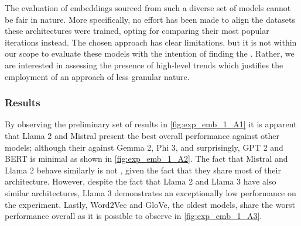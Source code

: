 
The evaluation of embeddings sourced from such a diverse set of models cannot be fair in nature.
More specifically, no effort has been made to align the datasets  these architectures were trained, opting for comparing their most popular iterations instead.
The chosen approach has clear limitations, but it is not within our scope to evaluate these models with the intention of finding the .
Rather, we are interested in assessing the presence of high-level trends which justifies the employment of an approach of less granular nature.

\subsubsection{Results}\label{sssec:exp_emb_exp1_results}

By observing the preliminary set of results in \cref{fig:exp_emb_1_A1} it is apparent that Llama 2 and Mistral present the best overall performance against other models; although their  against Gemma 2, Phi 3, and surprisingly, GPT 2 and BERT is minimal as shown in \cref{fig:exp_emb_1_A2}.
The fact that Mistral and Llama 2 behave similarly is not , given the fact that they share most of their architecture.
However, despite the fact that Llama 2 and Llama 3 have also similar architectures, Llama 3 demonstrates an exceptionally low performance on the experiment.
Lastly, Word2Vec and GloVe, the oldest models, share the worst performance overall as it is possible to observe in \cref{fig:exp_emb_1_A3}.

\begin{figure}[t!]
    \centering
    \quad
    \caption{}
    \label{fig:exp_emb_1_A}
\end{figure}

